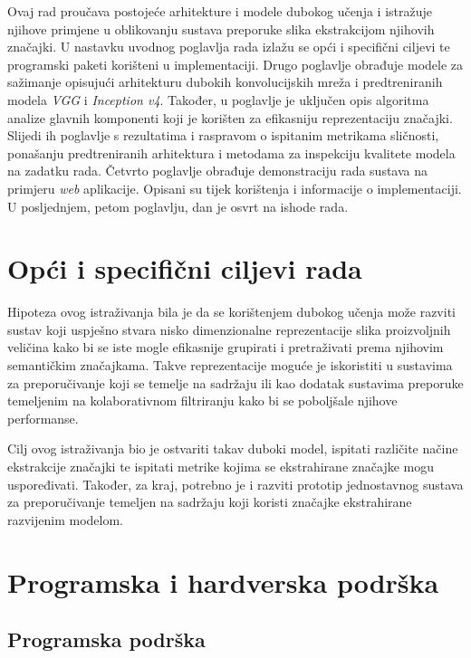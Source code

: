 \documentclass[times, utf8, proizvoljni, numeric]{fer}
\begin{document}
Ovaj rad proučava postojeće arhitekture i modele dubokog učenja i istražuje njihove primjene u oblikovanju sustava preporuke slika ekstrakcijom njihovih značajki. U nastavku uvodnog poglavlja rada izlažu se opći i specifični ciljevi te programski paketi korišteni u implementaciji. Drugo poglavlje obrađuje modele za sažimanje opisujući arhitekturu dubokih konvolucijskih mreža i predtreniranih modela \textit{VGG} i \textit{Inception v4}. Također, u poglavlje je uključen opis algoritma analize glavnih komponenti koji je korišten za efikasniju reprezentaciju značajki. Slijedi ih poglavlje s rezultatima i raspravom o ispitanim metrikama sličnosti, ponašanju predtreniranih arhitektura i metodama za inspekciju kvalitete modela na zadatku rada. Četvrto poglavlje obrađuje demonstraciju rada sustava na primjeru \textit{web} aplikacije. Opisani su tijek korištenja i informacije o implementaciji. U posljednjem, petom poglavlju, dan je osvrt na ishode rada.
 


\section{Opći i specifični ciljevi rada}

Hipoteza ovog istraživanja bila je da se korištenjem dubokog učenja može razviti sustav koji uspješno stvara nisko dimenzionalne reprezentacije slika proizvoljnih veličina kako bi se iste mogle efikasnije grupirati i pretraživati prema njihovim semantičkim značajkama. Takve reprezentacije moguće je iskoristiti u sustavima za preporučivanje koji se temelje na sadržaju ili kao dodatak sustavima preporuke temeljenim na kolaborativnom filtriranju kako bi se poboljšale njihove performanse.

Cilj ovog istraživanja bio je ostvariti takav duboki model, ispitati različite načine ekstrakcije značajki te ispitati metrike kojima se ekstrahirane značajke mogu uspoređivati. Također, za kraj, potrebno je i razviti prototip jednostavnog sustava za preporučivanje temeljen na sadržaju koji koristi značajke ekstrahirane razvijenim modelom.

\section{Programska i hardverska podrška}
\subsection{Programska podrška}
\end{document}
